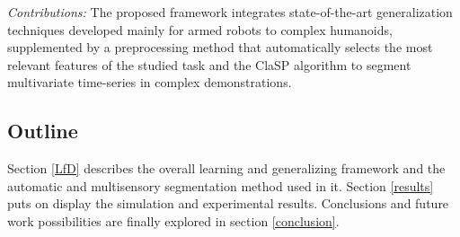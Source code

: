 \documentclass[conference]{IEEEtran}
\begin{document}
\textit{Contributions:} 
The proposed framework integrates state-of-the-art generalization techniques developed mainly for armed robots to complex humanoids, supplemented by a preprocessing method that automatically selects the most relevant features of the studied task and the ClaSP \cite{clasp} algorithm to segment multivariate time-series in complex demonstrations.

\subsection{Outline}

Section \ref{LfD} describes the overall learning and generalizing framework and the automatic and multisensory segmentation method used in it. Section \ref{results} puts on display the simulation and experimental results. Conclusions and future work possibilities are finally explored in section \ref{conclusion}.






\end{document}
